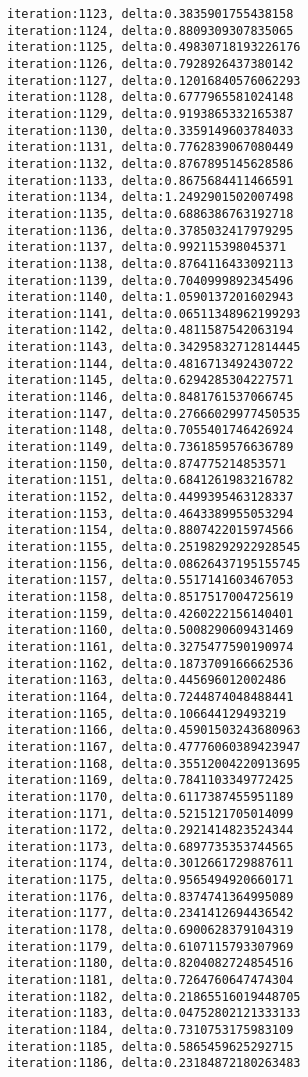 \documentclass[11pt]{article}
\begin{document}
\begin{Verbatim}[commandchars=\\\{\}]
iteration:1123, delta:0.3835901755438158
iteration:1124, delta:0.8809309307835065
iteration:1125, delta:0.49830718193226176
iteration:1126, delta:0.7928926437380142
iteration:1127, delta:0.12016840576062293
iteration:1128, delta:0.6777965581024148
iteration:1129, delta:0.9193865332165387
iteration:1130, delta:0.3359149603784033
iteration:1131, delta:0.7762839067080449
iteration:1132, delta:0.8767895145628586
iteration:1133, delta:0.8675684411466591
iteration:1134, delta:1.2492901502007498
iteration:1135, delta:0.6886386763192718
iteration:1136, delta:0.3785032417979295
iteration:1137, delta:0.992115398045371
iteration:1138, delta:0.8764116433092113
iteration:1139, delta:0.7040999892345496
iteration:1140, delta:1.0590137201602943
iteration:1141, delta:0.06511348962199293
iteration:1142, delta:0.4811587542063194
iteration:1143, delta:0.34295832712814445
iteration:1144, delta:0.4816713492430722
iteration:1145, delta:0.6294285304227571
iteration:1146, delta:0.8481761537066745
iteration:1147, delta:0.27666029977450535
iteration:1148, delta:0.7055401746426924
iteration:1149, delta:0.7361859576636789
iteration:1150, delta:0.874775214853571
iteration:1151, delta:0.6841261983216782
iteration:1152, delta:0.4499395463128337
iteration:1153, delta:0.4643389955053294
iteration:1154, delta:0.8807422015974566
iteration:1155, delta:0.25198292922928545
iteration:1156, delta:0.08626437195155745
iteration:1157, delta:0.5517141603467053
iteration:1158, delta:0.8517517004725619
iteration:1159, delta:0.4260222156140401
iteration:1160, delta:0.5008290609431469
iteration:1161, delta:0.3275477590190974
iteration:1162, delta:0.1873709166662536
iteration:1163, delta:0.445696012002486
iteration:1164, delta:0.7244874048488441
iteration:1165, delta:0.106644129493219
iteration:1166, delta:0.45901503243680963
iteration:1167, delta:0.47776060389423947
iteration:1168, delta:0.35512004220913695
iteration:1169, delta:0.7841103349772425
iteration:1170, delta:0.6117387455951189
iteration:1171, delta:0.5215121705014099
iteration:1172, delta:0.2921414823524344
iteration:1173, delta:0.6897735353744565
iteration:1174, delta:0.3012661729887611
iteration:1175, delta:0.9565494920660171
iteration:1176, delta:0.8374741364995089
iteration:1177, delta:0.2341412694436542
iteration:1178, delta:0.6900628379104319
iteration:1179, delta:0.6107115793307969
iteration:1180, delta:0.8204082724854516
iteration:1181, delta:0.7264760647474304
iteration:1182, delta:0.21865516019448705
iteration:1183, delta:0.04752802121333133
iteration:1184, delta:0.7310753175983109
iteration:1185, delta:0.5865459625292715
iteration:1186, delta:0.23184872180263483

\end{Verbatim}
\end{document}
